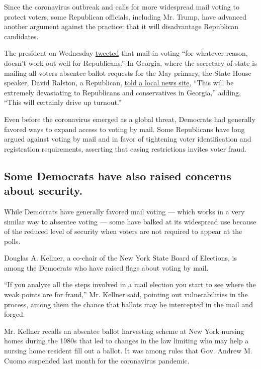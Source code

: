 Since the coronavirus outbreak and calls for more widespread mail voting
to protect voters, some Republican officials, including Mr. Trump, have
advanced another argument against the practice: that it will
disadvantage Republican candidates.

The president on Wednesday
\href{https://twitter.com/realDonaldTrump/status/1247861952736526336}{tweeted}
that mail-in voting ``for whatever reason, doesn't work out well for
Republicans.'' In Georgia, where the secretary of state is mailing all
voters absentee ballot requests for the May primary, the State House
speaker, David Ralston, a Republican,
\href{https://www.ajc.com/news/state--regional-govt--politics/pressure-mounts-for-further-delay-georgia-may-primary-election/K1wboFdcY1z7xYt7pa11MO/}{told
a local news site}, ``This will be extremely devastating to Republicans
and conservatives in Georgia,'' adding, ``This will certainly drive up
turnout.''

Even before the coronavirus emerged as a global threat, Democrats had
generally favored ways to expand access to voting by mail. Some
Republicans have long argued against voting by mail and in favor of
tightening voter identification and registration requirements, asserting
that easing restrictions invites voter fraud.

\hypertarget{some-democrats-have-also-raised-concerns-about-security}{%
\subsection{Some Democrats have also raised concerns about
security.}\label{some-democrats-have-also-raised-concerns-about-security}}

While Democrats have generally favored mail voting --- which works in a
very similar way to absentee voting --- some have balked at its
widespread use because of the reduced level of security when voters are
not required to appear at the polls.

Douglas A. Kellner, a co-chair of the New York State Board of Elections,
is among the Democrats who have raised flags about voting by mail.

``If you analyze all the steps involved in a mail election you start to
see where the weak points are for fraud,'' Mr. Kellner said, pointing
out vulnerabilities in the process, among them the chance that ballots
may be intercepted in the mail and forged.

Mr. Kellner recalls an absentee ballot harvesting scheme at New York
nursing homes during the 1980s that led to changes in the law limiting
who may help a nursing home resident fill out a ballot. It was among
rules that Gov. Andrew M. Cuomo suspended last month for the coronavirus
pandemic.


